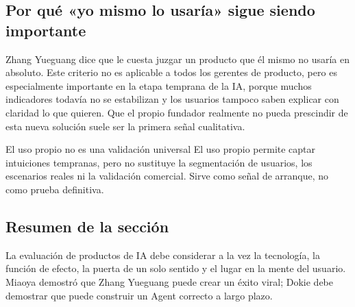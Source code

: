 \subsection{Por qué «yo mismo lo usaría» sigue siendo importante}

Zhang Yueguang dice que le cuesta juzgar un producto que él mismo no usaría en absoluto. Este criterio no es aplicable a todos los gerentes de producto, pero es especialmente importante en la etapa temprana de la IA, porque muchos indicadores todavía no se estabilizan y los usuarios tampoco saben explicar con claridad lo que quieren. Que el propio fundador realmente no pueda prescindir de esta nueva solución suele ser la primera señal cualitativa.

\begin{warningbox}{El uso propio no es una validación universal}
El uso propio permite captar intuiciones tempranas, pero no sustituye la segmentación de usuarios, los escenarios reales ni la validación comercial. Sirve como señal de arranque, no como prueba definitiva.
\end{warningbox}

\subsection{Resumen de la sección}

La evaluación de productos de IA debe considerar a la vez la tecnología, la función de efecto, la puerta de un solo sentido y el lugar en la mente del usuario. Miaoya demostró que Zhang Yueguang puede crear un éxito viral; Dokie debe demostrar que puede construir un Agent correcto a largo plazo.
